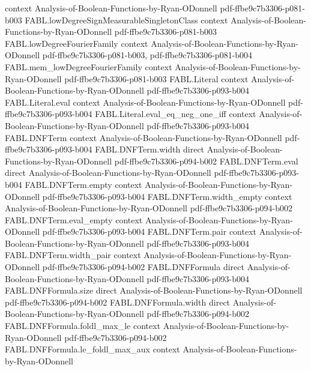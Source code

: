 \begin{theorem}
  {context}
  {Analysis-of-Boolean-Functions-by-Ryan-ODonnell}
  {pdf-ffbe9c7b3306-p081-b003}
\proofstep
  {FABL.lowDegreeSignMeasurableSingletonClass}
  {context}
  {Analysis-of-Boolean-Functions-by-Ryan-ODonnell}
  {pdf-ffbe9c7b3306-p081-b003}
\proofstep
  {FABL.lowDegreeFourierFamily}
  {context}
  {Analysis-of-Boolean-Functions-by-Ryan-ODonnell}
  {pdf-ffbe9c7b3306-p081-b003,
    pdf-ffbe9c7b3306-p081-b004}
\proofstep
  {FABL.mem_lowDegreeFourierFamily}
  {context}
  {Analysis-of-Boolean-Functions-by-Ryan-ODonnell}
  {pdf-ffbe9c7b3306-p081-b003}
\proofstep
  {FABL.Literal}
  {context}
  {Analysis-of-Boolean-Functions-by-Ryan-ODonnell}
  {pdf-ffbe9c7b3306-p093-b004}
\proofstep
  {FABL.Literal.eval}
  {context}
  {Analysis-of-Boolean-Functions-by-Ryan-ODonnell}
  {pdf-ffbe9c7b3306-p093-b004}
\proofstep
  {FABL.Literal.eval_eq_neg_one_iff}
  {context}
  {Analysis-of-Boolean-Functions-by-Ryan-ODonnell}
  {pdf-ffbe9c7b3306-p093-b004}
\proofstep
  {FABL.DNFTerm}
  {context}
  {Analysis-of-Boolean-Functions-by-Ryan-ODonnell}
  {pdf-ffbe9c7b3306-p093-b004}
\proofstep
  {FABL.DNFTerm.width}
  {direct}
  {Analysis-of-Boolean-Functions-by-Ryan-ODonnell}
  {pdf-ffbe9c7b3306-p094-b002}
\proofstep
  {FABL.DNFTerm.eval}
  {direct}
  {Analysis-of-Boolean-Functions-by-Ryan-ODonnell}
  {pdf-ffbe9c7b3306-p093-b004}
\proofstep
  {FABL.DNFTerm.empty}
  {context}
  {Analysis-of-Boolean-Functions-by-Ryan-ODonnell}
  {pdf-ffbe9c7b3306-p093-b004}
\proofstep
  {FABL.DNFTerm.width_empty}
  {context}
  {Analysis-of-Boolean-Functions-by-Ryan-ODonnell}
  {pdf-ffbe9c7b3306-p094-b002}
\proofstep
  {FABL.DNFTerm.eval_empty}
  {context}
  {Analysis-of-Boolean-Functions-by-Ryan-ODonnell}
  {pdf-ffbe9c7b3306-p093-b004}
\proofstep
  {FABL.DNFTerm.pair}
  {context}
  {Analysis-of-Boolean-Functions-by-Ryan-ODonnell}
  {pdf-ffbe9c7b3306-p093-b004}
\proofstep
  {FABL.DNFTerm.width_pair}
  {context}
  {Analysis-of-Boolean-Functions-by-Ryan-ODonnell}
  {pdf-ffbe9c7b3306-p094-b002}
\proofstep
  {FABL.DNFFormula}
  {direct}
  {Analysis-of-Boolean-Functions-by-Ryan-ODonnell}
  {pdf-ffbe9c7b3306-p093-b004}
\proofstep
  {FABL.DNFFormula.size}
  {direct}
  {Analysis-of-Boolean-Functions-by-Ryan-ODonnell}
  {pdf-ffbe9c7b3306-p094-b002}
\proofstep
  {FABL.DNFFormula.width}
  {direct}
  {Analysis-of-Boolean-Functions-by-Ryan-ODonnell}
  {pdf-ffbe9c7b3306-p094-b002}
\proofstep
  {FABL.DNFFormula.foldl_max_le}
  {context}
  {Analysis-of-Boolean-Functions-by-Ryan-ODonnell}
  {pdf-ffbe9c7b3306-p094-b002}
\proofstep
  {FABL.DNFFormula.le_foldl_max_aux}
  {context}
  {Analysis-of-Boolean-Functions-by-Ryan-ODonnell}

\end{theorem}
